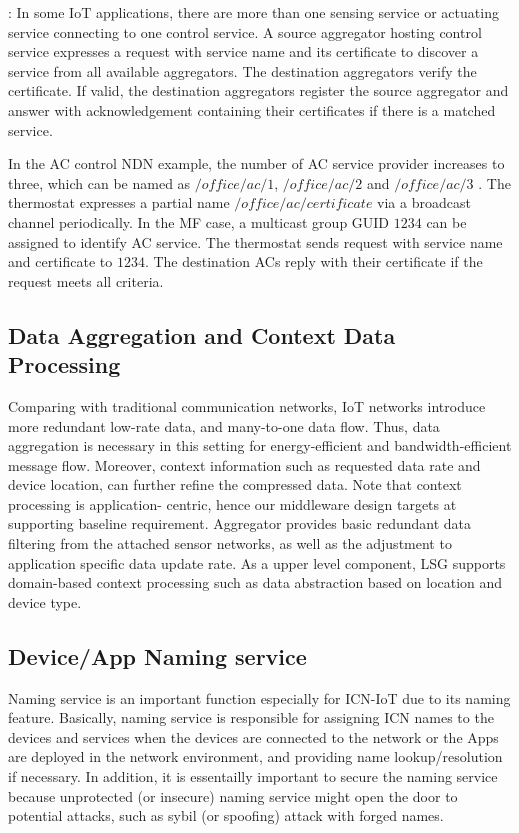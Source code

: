 \vspace{1mm}: In some IoT applications, there are more than one sensing service or actuating service connecting to one control service. A source aggregator hosting control service expresses a request with service name and its certificate to discover a service from all  available aggregators. The destination aggregators verify the certificate. If valid, the destination aggregators register the source aggregator and  answer with acknowledgement containing their certificates if there is a matched service.

In the AC control NDN example, the number of AC service provider increases to three, which can be named as $/office/ac/1$, $/office/ac/2$ and $/office/ac/3$ . The thermostat expresses a partial name $/office/ac/certificate$ via a broadcast channel periodically. In the MF case, a multicast group GUID $1234$ can be assigned to identify AC service. The thermostat sends request with service name and certificate to $1234$. The destination ACs reply with their certificate if the request meets all criteria.
\subsection{Data Aggregation and Context Data Processing}
Comparing with traditional communication networks, IoT networks introduce more redundant low-rate data, and many-to-one data flow. Thus, data aggregation is necessary in this setting for energy-efficient and bandwidth-efficient message flow. Moreover, context information such as requested data rate and device location, can further refine the compressed data. Note that context processing is application- centric, hence our middleware design targets at supporting baseline requirement. Aggregator provides basic redundant data filtering from the attached sensor networks, as well as the adjustment to application specific data update rate. As a upper level component, LSG supports domain-based context processing such as data abstraction based on location and device type.

\subsection{Device/App Naming service}  
Naming service is an important function especially for ICN-IoT due to its naming feature. Basically, naming service is responsible for assigning ICN names to the devices and services when the devices are connected to the network or the Apps are deployed in the network environment, and providing name lookup/resolution if necessary. In addition, it is essentailly important to secure the naming service because unprotected (or insecure) naming service might open the door to potential attacks, such as sybil (or spoofing) attack \cite{sybil} with forged names.
 
